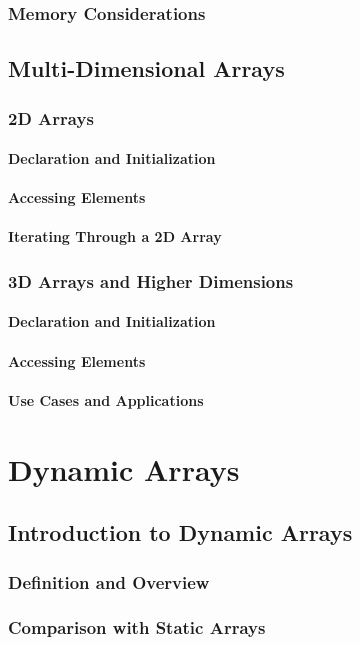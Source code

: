 \documentclass[12pt, oneside]{book}
\begin{document}
	\subsection{Memory Considerations}
	\section{Multi-Dimensional Arrays}
	\subsection{2D Arrays}
	\subsubsection{Declaration and Initialization}
	\subsubsection{Accessing Elements}
	\subsubsection{Iterating Through a 2D Array}
	\subsection{3D Arrays and Higher Dimensions}
	\subsubsection{Declaration and Initialization}
	\subsubsection{Accessing Elements}
	\subsubsection{Use Cases and Applications}
	\chapter{Dynamic Arrays}
	\section{Introduction to Dynamic Arrays}
	\subsection{Definition and Overview}
	\subsection{Comparison with Static Arrays}
	
\end{document}
